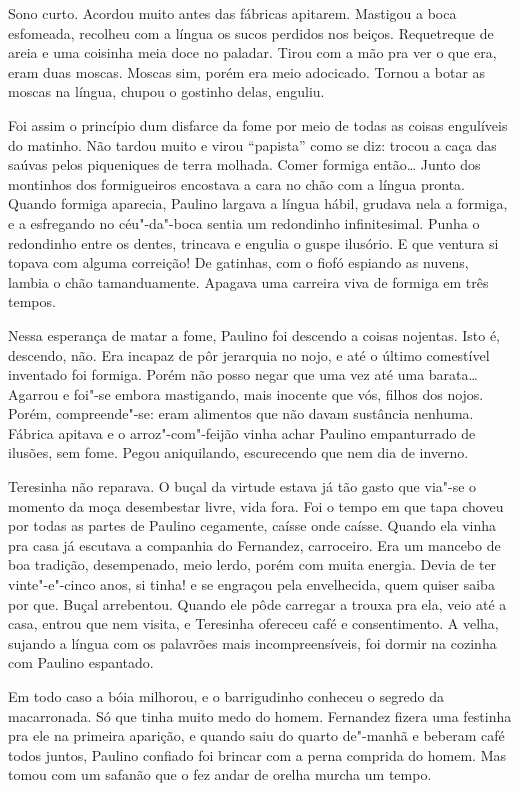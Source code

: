 \begin{linenumbers}
Sono curto. Acordou muito antes das fábricas apitarem. Mastigou a boca
esfomeada, recolheu com a língua os sucos perdidos nos beiços.
Requetreque de areia e uma coisinha meia doce no paladar. Tirou com a
mão pra ver o que era, eram duas moscas. Moscas sim, porém era meio
adocicado. Tornou a botar as moscas na língua, chupou o gostinho delas,
enguliu.

Foi assim o princípio dum disfarce da fome por meio de todas as coisas
engulíveis do matinho. Não tardou muito e virou ``papista'' como se diz:
trocou a caça das saúvas pelos piqueniques de terra molhada. Comer
formiga então\ldots{} Junto dos montinhos dos formigueiros encostava a cara
no chão com a língua pronta. Quando formiga aparecia, Paulino largava a
língua hábil, grudava nela a formiga, e a esfregando no céu"-da"-boca
sentia um redondinho infinitesimal. Punha o redondinho entre os dentes,
trincava e engulia o guspe ilusório. E que ventura si topava com alguma
correição! De gatinhas, com o fiofó espiando as nuvens, lambia o chão
tamanduamente. Apagava uma carreira viva de formiga em três tempos.

Nessa esperança de matar a fome, Paulino foi descendo a coisas nojentas.
Isto é, descendo, não. Era incapaz de pôr jerarquia no nojo, e até o
último comestível inventado foi formiga. Porém não posso negar que uma
vez até uma barata\ldots{} Agarrou e foi"-se embora mastigando, mais inocente
que vós, filhos dos nojos. Porém, compreende"-se: eram alimentos que não
davam sustância nenhuma. Fábrica apitava e o arroz"-com"-feijão vinha
achar Paulino empanturrado de ilusões, sem fome. Pegou aniquilando,
escurecendo que nem dia de inverno.

Teresinha não reparava. O buçal da virtude estava já tão gasto que
via"-se o momento da moça desembestar livre, vida fora. Foi o tempo em
que tapa choveu por todas as partes de Paulino cegamente, caísse onde
caísse. Quando ela vinha pra casa já escutava a companhia do Fernandez,
carroceiro. Era um mancebo de boa tradição, desempenado, meio lerdo,
porém com muita energia. Devia de ter vinte"-e"-cinco anos, si tinha! e se
engraçou pela envelhecida, quem quiser saiba por que. Buçal arrebentou.
Quando ele pôde carregar a trouxa pra ela, veio até a casa, entrou que
nem visita, e Teresinha ofereceu café e consentimento. A velha, sujando
a língua com os palavrões mais incompreensíveis, foi dormir na cozinha
com Paulino espantado.

Em todo caso a bóia milhorou, e o barrigudinho conheceu o segredo da
macarronada. Só que tinha muito medo do homem. Fernandez fizera uma
festinha pra ele na primeira aparição, e quando saiu do quarto de"-manhã
e beberam café todos juntos, Paulino confiado foi brincar com a perna
comprida do homem. Mas tomou com um safanão que o fez andar de orelha
murcha um tempo.


\end{linenumbers}
